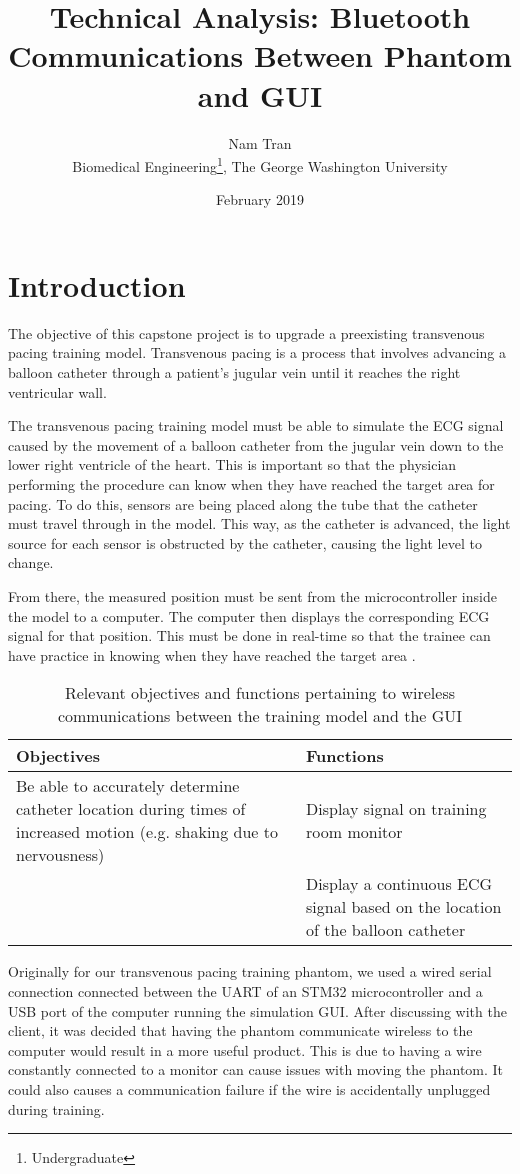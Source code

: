 \documentclass[12pt, titlepage]{article}
\title{Technical Analysis: Bluetooth Communications Between Phantom and GUI}
\author{Nam Tran\\ Biomedical Engineering\thanks{Undergraduate}, The George Washington University}
\date{February 2019}
\begin{document}
\maketitle

\section{Introduction}
The objective of this capstone project is to upgrade a preexisting transvenous pacing training model. Transvenous pacing is a process that involves advancing a balloon catheter through a patient's jugular vein until it reaches the right ventricular wall.

The transvenous pacing training model must be able to simulate the ECG signal caused by the movement of a balloon catheter from the jugular vein down to the lower right ventricle of the heart. This is important so that the physician performing the procedure can know when they have reached the target area for pacing. To do this, sensors are being placed along the tube that the catheter must travel through in the model. This way, as the catheter is advanced, the light source for each sensor is obstructed by the catheter, causing the light level to change.

From there, the measured position must be sent from the microcontroller inside the model to a computer. The computer then displays the corresponding ECG signal for that position. This must be done in real-time so that the trainee can have practice in knowing when they have reached the target area \cite{backgroundreport}.

\begin{table}[h!]
    \centering
    \begin{tabular}{p{6cm}|p{6cm}}
        \hline
         Objectives & Functions \\
        \hline
         Be able to accurately determine catheter location during times of increased motion (e.g. shaking due to nervousness) & Display signal on training room monitor \\
          & Display a continuous ECG signal based on the location of the balloon catheter \\
    \end{tabular}
    \caption{Relevant objectives and functions pertaining to wireless communications between the training model and the GUI}
    \label{tab:my_label}
\end{table}

Originally for our transvenous pacing training phantom, we used a wired serial connection connected between the UART of an STM32 microcontroller and a USB port of the computer running the simulation GUI. After discussing with the client, it was decided that having the phantom communicate wireless to the computer would result in a more useful product. This is due to having a wire constantly connected to a monitor can cause issues with moving the phantom. It could also causes a communication failure if the wire is accidentally unplugged during training.
\end{document}
